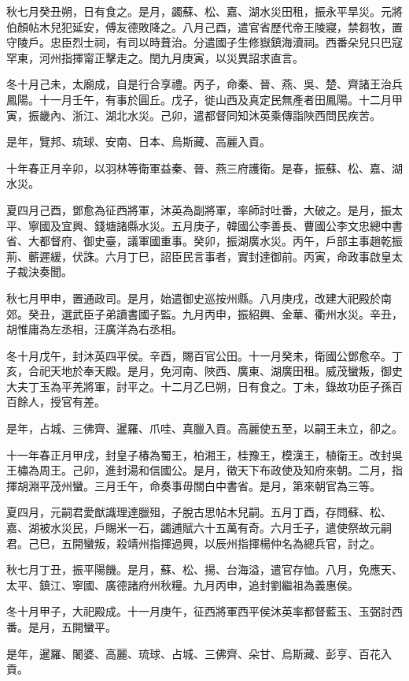 \begin{pinyinscope}
秋七月癸丑朔，日有食之。是月，蠲蘇、松、嘉、湖水災田租，振永平旱災。元將伯顏帖木兒犯延安，傅友德敗降之。八月己酉，遣官省歷代帝王陵寢，禁芻牧，置守陵戶。忠臣烈士祠，有司以時葺治。分遣國子生修嶽鎮海瀆祠。西番朵兒只巴寇罕東，河州指揮甯正擊走之。閏九月庚寅，以災異詔求直言。

冬十月己未，太廟成，自是行合享禮。丙子，命秦、晉、燕、吳、楚、齊諸王治兵鳳陽。十一月壬午，有事於圓丘。戊子，徙山西及真定民無產者田鳳陽。十二月甲寅，振畿內、浙江、湖北水災。己卯，遣都督同知沐英乘傳詣陜西問民疾苦。

是年，覽邦、琉球、安南、日本、烏斯藏、高麗入貢。

十年春正月辛卯，以羽林等衛軍益秦、晉、燕三府護衛。是春，振蘇、松、嘉、湖水災。

夏四月己酉，鄧愈為征西將軍，沐英為副將軍，率師討吐番，大破之。是月，振太平、寧國及宜興、錢塘諸縣水災。五月庚子，韓國公李善長、曹國公李文忠總中書省、大都督府、御史臺，議軍國重事。癸卯，振湖廣水災。丙午，戶部主事趙乾振荊、蘄遲緩，伏誅。六月丁巳，詔臣民言事者，實封達御前。丙寅，命政事啟皇太子裁決奏聞。

秋七月甲申，置通政司。是月，始遣御史巡按州縣。八月庚戌，改建大祀殿於南郊。癸丑，選武臣子弟讀書國子監。九月丙申，振紹興、金華、衢州水災。辛丑，胡惟庸為左丞相，汪廣洋為右丞相。

冬十月戊午，封沐英四平侯。辛酉，賜百官公田。十一月癸未，衛國公鄧愈卒。丁亥，合祀天地於奉天殿。是月，免河南、陜西、廣東、湖廣田租。威茂蠻叛，御史大夫丁玉為平羌將軍，討平之。十二月乙巳朔，日有食之。丁未，錄故功臣子孫百百餘人，授官有差。

是年，占城、三佛齊、暹羅、爪哇、真臘入貢。高麗使五至，以嗣王未立，卻之。

十一年春正月甲戌，封皇子椿為蜀王，柏湘王，桂豫王，模漢王，植衛王。改封吳王橚為周王。己卯，進封湯和信國公。是月，徵天下布政使及知府來朝。二月，指揮胡淵平茂州蠻。三月壬午，命奏事毋關白中書省。是月，第來朝官為三等。

夏四月，元嗣君愛猷識理達臘殂，子脫古思帖木兒嗣。五月丁酉，存問蘇、松、嘉、湖被水災民，戶賜米一石，蠲逋賦六十五萬有奇。六月壬子，遣使祭故元嗣君。己巳，五開蠻叛，殺靖州指揮過興，以辰州指揮楊仲名為總兵官，討之。

秋七月丁丑，振平陽饑。是月，蘇、松、揚、台海溢，遣官存恤。八月，免應天、太平、鎮江、寧國、廣德諸府州秋糧。九月丙申，追封劉繼祖為義惠侯。

冬十月甲子，大祀殿成。十一月庚午，征西將軍西平侯沐英率都督藍玉、玉弼討西番。是月，五開蠻平。

是年，暹羅、闍婆、高麗、琉球、占城、三佛齊、朵甘、烏斯藏、彭亨、百花入貢。


\end{pinyinscope}
